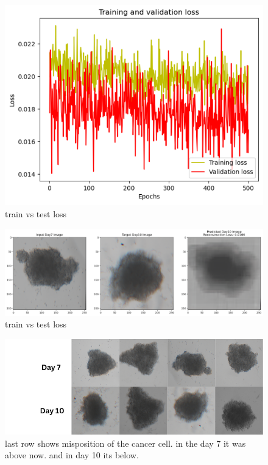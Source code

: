 \begin{figure}[H]
  \centering
  \includegraphics[scale=0.46]{figures/rankloss.png} 
  \caption{train vs test loss}
  \label{fig:unloss}
\end{figure}

\begin{figure}[H]
  \centering
  \includegraphics[scale=0.46]{figures/unpred.png} 
  \caption{train vs test loss}
  \label{fig:unloss}
\end{figure}

\begin{figure}[H]
  \centering
  \includegraphics[scale=0.5]{figures/pproblem.png} 
  \caption{last row shows misposition of the cancer cell. in the day 7 it was above now. and in day 10 its below.}
  \label{fig:unloss}
\end{figure}


